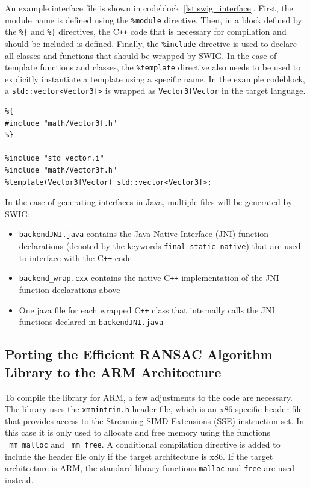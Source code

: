 An example interface file is shown in codeblock~\ref{lst:swig_interface}.
First, the module name is defined using the \texttt{\%module} directive.
Then, in a block defined by the \texttt{\%\{} and \texttt{\%\}} directives,
the C\texttt{++} code that is necessary for compilation and should be included is defined.
Finally, the \texttt{\%include} directive is used to declare all classes and functions that should be wrapped by SWIG\@.
In the case of template functions and classes, the \texttt{\%template} directive also needs to be used
to explicitly instantiate a template using a specific name.
In the example codeblock, a \texttt{std::vector<Vector3f>} is wrapped as \texttt{Vector3fVector} in the target language.

\begin{lstlisting}[caption=Example SWIG interface file, label=lst:swig_interface]
%module backend
%{
#include "math/Vector3f.h"
%}

%include "std_vector.i"
%include "math/Vector3f.h"
%template(Vector3fVector) std::vector<Vector3f>;
\end{lstlisting}

In the case of generating interfaces in Java, multiple files will be generated by SWIG\@:
\begin{itemize}
    \item \texttt{backendJNI.java} contains the Java Native Interface (JNI) function declarations (denoted by the keywords \texttt{final static native}) that are used to interface with the C\texttt{++} code
    \item \texttt{backend\_wrap.cxx} contains the native C\texttt{++} implementation of the JNI function declarations above
    \item One java file for each wrapped C\texttt{++} class that internally calls the JNI functions declared in \texttt{backendJNI.java}
\end{itemize}

\subsection{Porting the Efficient RANSAC Algorithm Library to the ARM Architecture}
%
To compile the library for ARM, a few adjustments to the code are necessary.
The library uses the \texttt{xmmintrin.h} header file, which is an x86-specific header file
that provides access to the Streaming SIMD Extensions (SSE) instruction set. %
In this case it is only used to allocate and free memory using the functions \texttt{\_mm\_malloc} and \texttt{\_mm\_free}.
A conditional compilation directive is added to include the header file only if the target architecture is x86.
If the target architecture is ARM, the standard library functions \texttt{malloc} and \texttt{free} are used instead.

